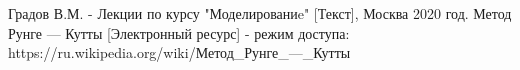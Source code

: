 \newpage
{}

\begin{thebibliography}{}
      Градов В.М.  -  Лекции по курсу "Моделированиe" [Текст], Москва 2020 год.
      Метод Рунге — Кутты [Электронный ресурс]   - режим доступа: https://ru.wikipedia.org/wiki/Метод\_Рунге\_—\_Кутты
\end{thebibliography}

